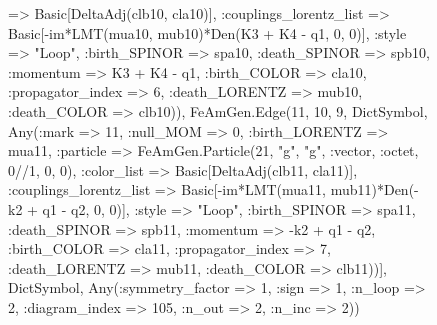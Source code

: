 \documentclass{revtex4}
\begin{document}
\begin{figure}[!htb]
\begin{center}
{=> Basic[DeltaAdj(clb10, cla10)], :couplings_lorentz_list => Basic[-im*LMT(mua10, mub10)*Den(K3 + K4 - q1, 0, 0)], :style => "Loop", :birth_SPINOR => spa10, :death_SPINOR => spb10, :momentum => K3 + K4 - q1, :birth_COLOR => cla10, :propagator_index => 6, :death_LORENTZ => mub10, :death_COLOR => clb10)), FeAmGen.Edge(11, 10, 9, Dict{Symbol, Any}(:mark => 11, :null_MOM => 0, :birth_LORENTZ => mua11, :particle => FeAmGen.Particle(21, "g", "g", :vector, :octet, 0//1, 0, 0), :color_list => Basic[DeltaAdj(clb11, cla11)], :couplings_lorentz_list => Basic[-im*LMT(mua11, mub11)*Den(-k2 + q1 - q2, 0, 0)], :style => "Loop", :birth_SPINOR => spa11, :death_SPINOR => spb11, :momentum => -k2 + q1 - q2, :birth_COLOR => cla11, :propagator_index => 7, :death_LORENTZ => mub11, :death_COLOR => clb11))], Dict{Symbol, Any}(:symmetry_factor => 1, :sign => 1, :n_loop => 2, :diagram_index => 105, :n_out => 2, :n_inc => 2)) 
}
\end{center}
\end{figure}
\end{document}
